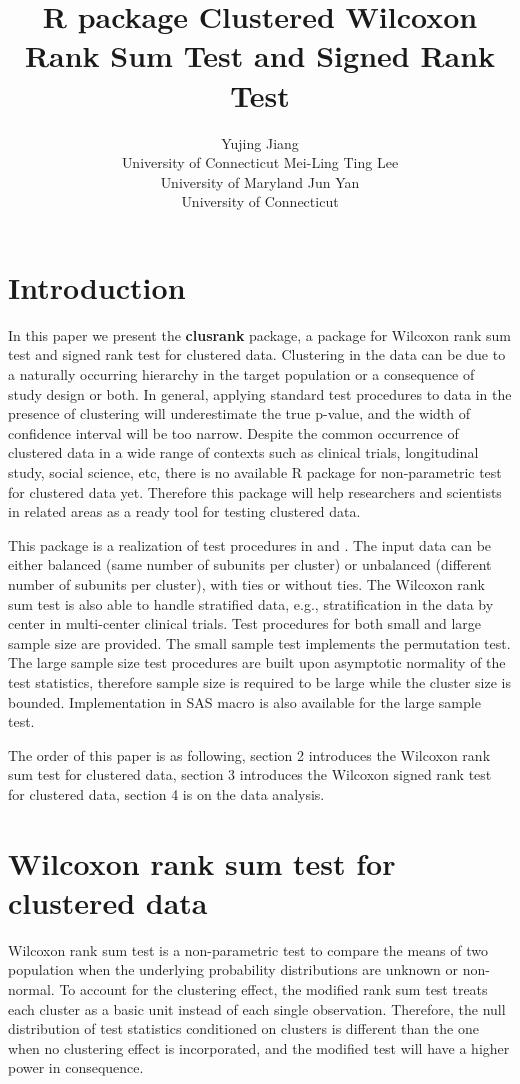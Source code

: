 \documentclass[article]{jss}
\author{Yujing Jiang\\ University of Connecticut \And 
        Mei-Ling Ting Lee\\ University of Maryland
        \And  
        Jun Yan\\ University of Connecticut }
\title{R package Clustered Wilcoxon Rank Sum Test and Signed Rank Test}
\begin{document}

\section{Introduction}
In this paper we present the \textbf{clusrank} package, a package 
for Wilcoxon rank sum test  
and signed rank test 
for clustered data.  
Clustering in the data can be due to 
a naturally occurring hierarchy in the target population
or a consequence of study design or both. 
In general,
applying standard test procedures to data in the presence 
of clustering will underestimate the true p-value, and 
the width of confidence interval will be too narrow.  
Despite the common occurrence of 
clustered data in a wide range of contexts such as 
clinical trials, longitudinal study, social science, etc,
there is no available R package for non-parametric test
for clustered data yet. Therefore this package will help 
researchers and scientists in related areas as a ready tool
for testing clustered data.


This package is a realization of test procedures in 
\citet{Rosn:GLyn:Lee:inco:2003} and \citet{Roxn:Glyn:Lee:wilc:2006}.
The input data can be either balanced (same number of 
subunits per cluster) or unbalanced (different number of subunits 
per cluster), with ties or without ties. The Wilcoxon rank sum
test is also able to handle stratified data, e.g., stratification in the data
by center in multi-center clinical trials. Test procedures for both small and large sample size are provided. The small sample test implements the permutation test. The large sample size test
procedures are built upon asymptotic normality of the test statistics, therefore
sample size is required to be large while the cluster size is bounded. Implementation in
SAS macro is also available for the large sample test.


The order of this paper is as following, 
section 2 introduces the Wilcoxon rank 
sum test for clustered data, section 3 
introduces the Wilcoxon signed rank test 
for clustered data, section 4 is on the 
data analysis.


\section{Wilcoxon rank sum test for clustered data}
Wilcoxon rank sum test is a non-parametric test
to compare the means of two population when the 
underlying probability distributions are unknown 
or non-normal. To account for the clustering effect,
the modified rank sum test treats each cluster as a 
basic unit instead of each single observation. 
Therefore, the null distribution of test statistics
conditioned on clusters is different than the one
when no clustering effect is incorporated,
and the modified test will have a higher power in 
consequence. 
\end{document}
